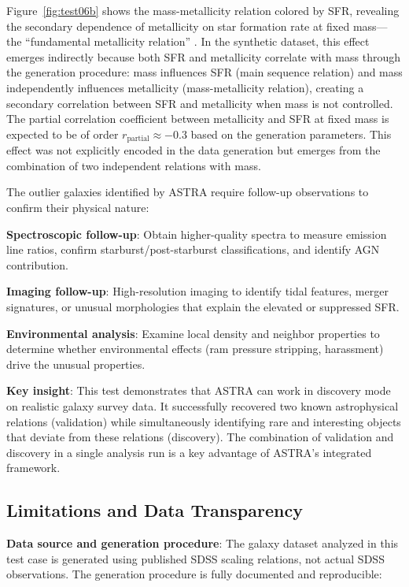 \documentclass[usenatbib]{rasti}
\begin{document}
Figure~\ref{fig:test06b} shows the mass-metallicity relation colored by SFR, revealing the secondary dependence of metallicity on star formation rate at fixed mass---the ``fundamental metallicity relation'' \cite{mannucci2010}. In the synthetic dataset, this effect emerges indirectly because both SFR and metallicity correlate with mass through the generation procedure: mass influences SFR (main sequence relation) and mass independently influences metallicity (mass-metallicity relation), creating a secondary correlation between SFR and metallicity when mass is not controlled. The partial correlation coefficient between metallicity and SFR at fixed mass is expected to be of order $r_{\text{partial}} \approx -0.3$ based on the generation parameters. This effect was not explicitly encoded in the data generation but emerges from the combination of two independent relations with mass.

The outlier galaxies identified by ASTRA require follow-up observations to confirm their physical nature:
\begin{description}
\item \textbf{Spectroscopic follow-up}: Obtain higher-quality spectra to measure emission line ratios, confirm starburst/post-starburst classifications, and identify AGN contribution.
\item \textbf{Imaging follow-up}: High-resolution imaging to identify tidal features, merger signatures, or unusual morphologies that explain the elevated or suppressed SFR.
\item \textbf{Environmental analysis}: Examine local density and neighbor properties to determine whether environmental effects (ram pressure stripping, harassment) drive the unusual properties.
\end{description}

\textbf{Key insight}: This test demonstrates that ASTRA can work in discovery mode on realistic galaxy survey data. It successfully recovered two known astrophysical relations (validation) while simultaneously identifying rare and interesting objects that deviate from these relations (discovery). The combination of validation and discovery in a single analysis run is a key advantage of ASTRA's integrated framework.

\subsection{Limitations and Data Transparency}

\textbf{Data source and generation procedure}: The galaxy dataset analyzed in this test case is generated using published SDSS scaling relations, not actual SDSS observations. The generation procedure \cite{kauffmann2003,brinchmann2004,tremonti2004} is fully documented and reproducible:
\end{document}
